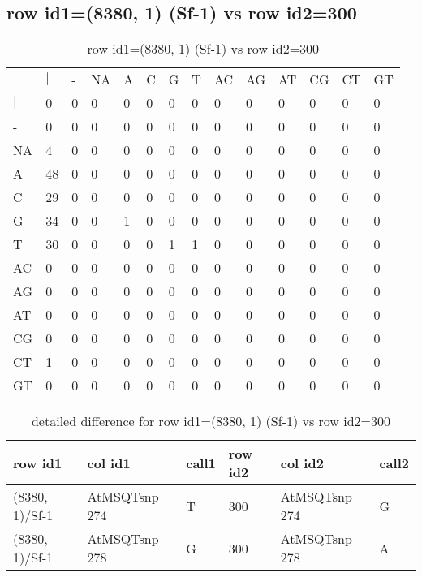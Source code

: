 \subsection{row id1=(8380, 1) (Sf-1) vs row id2=300}
\begin{center}
\begin{longtable}{|l|l|l|l|l|l|l|l|l|l|l|l|l|l|}
\caption{row id1=(8380, 1) (Sf-1) vs row id2=300} \label{table_dm420}\\
\hline
\\
\hline
&$|$&-&NA&A&C&G&T&AC&AG&AT&CG&CT&GT\\
$|$&0&0&0&0&0&0&0&0&0&0&0&0&0\\
-&0&0&0&0&0&0&0&0&0&0&0&0&0\\
NA&4&0&0&0&0&0&0&0&0&0&0&0&0\\
A&48&0&0&0&0&0&0&0&0&0&0&0&0\\
C&29&0&0&0&0&0&0&0&0&0&0&0&0\\
G&34&0&0&1&0&0&0&0&0&0&0&0&0\\
T&30&0&0&0&0&1&1&0&0&0&0&0&0\\
AC&0&0&0&0&0&0&0&0&0&0&0&0&0\\
AG&0&0&0&0&0&0&0&0&0&0&0&0&0\\
AT&0&0&0&0&0&0&0&0&0&0&0&0&0\\
CG&0&0&0&0&0&0&0&0&0&0&0&0&0\\
CT&1&0&0&0&0&0&0&0&0&0&0&0&0\\
GT&0&0&0&0&0&0&0&0&0&0&0&0&0\\
\hline
\end{longtable}
\end{center}

\begin{center}
\begin{longtable}{|l|l|l|l|l|l|}
\caption{detailed difference for row id1=(8380, 1) (Sf-1) vs row id2=300} \label{table_dm421}\\
\hline
row id1&col id1&call1&row id2&col id2&call2\\
\hline
(8380, 1)/Sf-1&AtMSQTsnp 274&T&300&AtMSQTsnp 274&G\\
(8380, 1)/Sf-1&AtMSQTsnp 278&G&300&AtMSQTsnp 278&A\\
\hline
\end{longtable}
\end{center}

